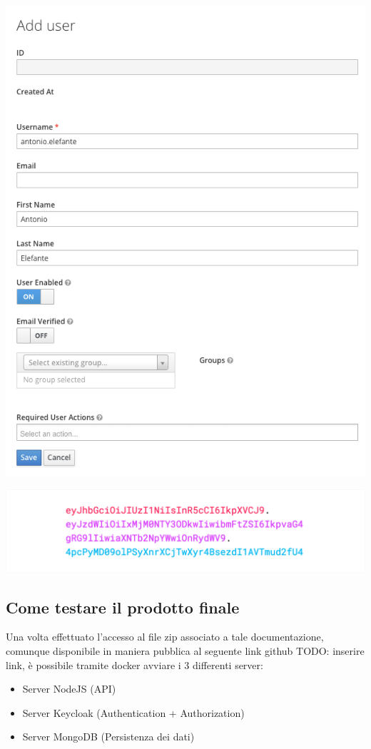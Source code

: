 \documentclass[twoside]{report}
\begin{document}
\begin{minipage}{\linewidth}
    \vspace{2mm}
    \centering
    \includegraphics[width= 0.5 \linewidth]{6.png}
    \vspace{2mm}
\end{minipage}

\begin{minipage}{\linewidth}
    \vspace{2mm}
    \centering
    \includegraphics[width= 0.5\linewidth]{1.png}
    \vspace{2mm}
\end{minipage}
\newpage
\subsection{Come testare il prodotto finale}

Una volta effettuato l'accesso al file zip associato a tale documentazione, comunque disponibile in maniera pubblica al seguente link github TODO: inserire link, è possibile tramite docker avviare i 3 differenti server:

\begin{itemize}
    \item Server NodeJS (API)
    \item Server Keycloak (Authentication + Authorization)
    \item Server MongoDB (Persistenza dei dati)
\end{itemize}
\end{document}
